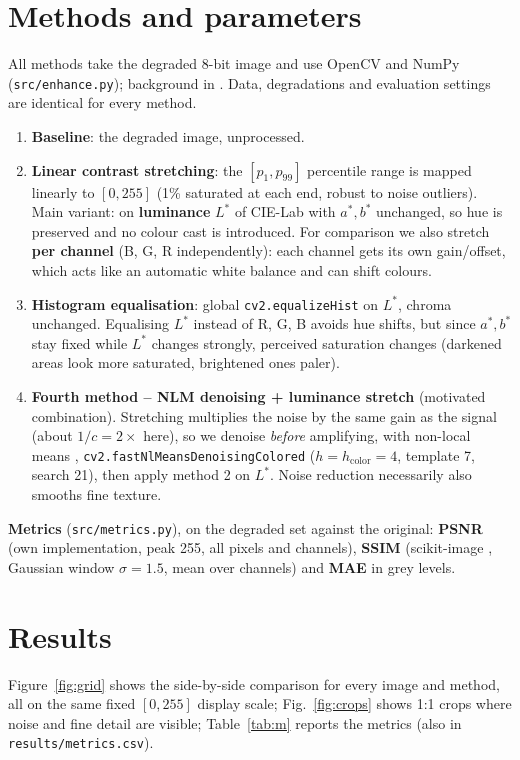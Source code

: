 \documentclass[10pt,a4paper]{article}
\begin{document}
\section{Methods and parameters}
All methods take the degraded 8-bit image and use OpenCV \cite{opencv} and NumPy (\texttt{src/enhance.py});
background in \cite{gw}. Data, degradations and evaluation settings are identical for every method.
\begin{enumerate}
\item \textbf{Baseline}: the degraded image, unprocessed.
\item \textbf{Linear contrast stretching}: the $[p_1,p_{99}]$ percentile range is mapped linearly to $[0,255]$
(1\% saturated at each end, robust to noise outliers). Main variant: on \textbf{luminance} $L^*$ of CIE-Lab with
$a^*,b^*$ unchanged, so hue is preserved and no colour cast is introduced. For comparison we also stretch
\textbf{per channel} (B, G, R independently): each channel gets its own gain/offset, which acts like an automatic
white balance and can shift colours.
\item \textbf{Histogram equalisation}: global \texttt{cv2.equalizeHist} on $L^*$, chroma unchanged. Equalising
$L^*$ instead of R, G, B avoids hue shifts, but since $a^*,b^*$ stay fixed while $L^*$ changes strongly, perceived
saturation changes (darkened areas look more saturated, brightened ones paler).
\item \textbf{Fourth method -- NLM denoising + luminance stretch} (motivated combination). Stretching multiplies the
noise by the same gain as the signal (about $1/c=2\times$ here), so we denoise \emph{before} amplifying, with
non-local means \cite{buades2005}, \texttt{cv2.fastNlMeansDenoisingColored} ($h=h_\text{color}=4$, template 7,
search 21), then apply method 2 on $L^*$. Noise reduction necessarily also smooths fine texture.
\end{enumerate}

\textbf{Metrics} (\texttt{src/metrics.py}), on the degraded set against the original: \textbf{PSNR} (own
implementation, peak 255, all pixels and channels), \textbf{SSIM} \cite{wang2004} (scikit-image \cite{skimage},
Gaussian window $\sigma=1.5$, mean over channels) and \textbf{MAE} in grey levels.

\section{Results}
Figure~\ref{fig:grid} shows the side-by-side comparison for every image and method, all on the same fixed
$[0,255]$ display scale; Fig.~\ref{fig:crops} shows 1:1 crops where noise and fine detail are visible;
Table~\ref{tab:m} reports the metrics (also in \texttt{results/metrics.csv}).
\end{document}
